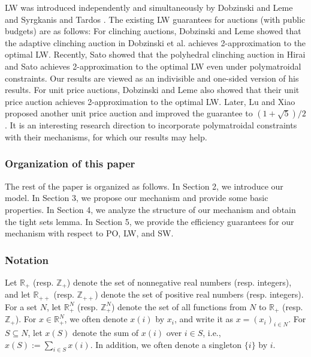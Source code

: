 \documentclass[letterpaper,11pt]{article}
\begin{document}
LW was introduced independently and simultaneously by Dobzinski and Leme \cite{DL2014} and Syrgkanis and Tardos \cite{ST2013}. The existing LW guarantees for auctions (with public budgets) are as follows: For clinching auctions, Dobzinski and Leme \cite{DL2014} showed that the adaptive clinching auction in Dobzinski et al. \cite{DLN2012} achieves 2-approximation to the optimal LW. Recently, Sato \cite{S2023} showed that the polyhedral clinching auction in Hirai and Sato \cite{HS2022} achieves 2-approximation to the optimal LW even under polymatroidal constraints. Our results are viewed as an indivisible and one-sided version of his results. For unit price auctions, Dobzinski and Leme \cite{DL2014} also showed that their unit price auction achieves 2-approximation to the optimal LW. Later, Lu and Xiao \cite{LX2015} proposed another unit price auction and improved the guarantee to $(1+\sqrt{5})/2$. 
It is an interesting research direction to incorporate polymatroidal constraints with their mechanisms, for which our results may help.

\subsubsection*{Organization of this paper}
The rest of the paper is organized as follows.
In Section 2, we introduce our model. In Section 3, we propose our mechanism and provide some basic properties.
In Section 4, we analyze the structure of our mechanism and obtain the tight sets lemma.
In Section 5, we provide the efficiency guarantees for our mechanism with respect to PO, LW, and SW.

\subsubsection*{Notation}
Let $\mathbb R_+$ (resp. $\mathbb Z_+$) denote the set of nonnegative real numbers (resp. integers), and 
let $\mathbb R_{++}$ (resp. $\mathbb Z_{++}$) denote the set of positive real numbers (resp. integers).
For a set $N$, let $\mathbb R^N_+$ (resp. $\mathbb Z^N_+$) denote the set of 
all functions from $N$ to $\mathbb R_+$ (resp. $\mathbb Z_+$). 
For $x\in \mathbb R^N_+$, we often denote $x(i)$ by $x_i$, and write it as $x= (x_i)_{i\in N}$. 
For $S\subseteq N$, let $x(S)$ denote the sum of $x(i)$ over $i\in S$, i.e., $x(S) := \sum_{i\in S} x(i)$.
In addition, we often denote a singleton $\{i\}$ by $i$. 
\end{document}
